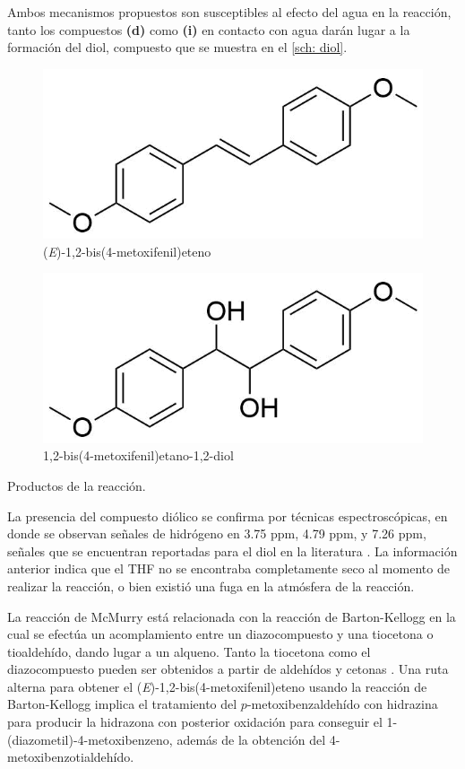 \documentclass[fleqn,11pt]{SelfArx}
\begin{document}
\pagebreak
Ambos mecanismos propuestos son susceptibles al efecto del agua en la reacci\'on, tanto los compuestos \textbf{(d)} como \textbf{(i)} en contacto con agua dar\'an lugar a la formaci\'on del diol, compuesto que se muestra en el \autoref{sch: diol}.
\begin{scheme}[h]
	\centering
	\scriptsize
	\begin{subfigure}[t]{0.49\linewidth}
		\centering
		\includegraphics[width=0.9\linewidth]{structures/product.png}
		\caption{(\textit{E})-1,2-bis(4-metoxifenil)eteno}
		\label{sch: producto}
	\end{subfigure}
	\begin{subfigure}[t]{0.49\linewidth}
		\centering
		\includegraphics[width=0.9\linewidth]{structures/product2.png}
		\caption{1,2-bis(4-metoxifenil)etano-1,2-diol}
		\label{sch: diol}
	\end{subfigure}
	\caption{Productos de la reacci\'on.}
\end{scheme}

La presencia del compuesto di\'olico se confirma por t\'ecnicas espectrosc\'opicas, en donde se observan señales de hidr\'ogeno en 3.75 ppm, 4.79 ppm, y 7.26 ppm, señales que se encuentran reportadas para el diol en la literatura \cite{Uchiyama2004}. La informaci\'on anterior indica que el THF no se encontraba completamente seco al momento de realizar la reacci\'on, o bien existi\'o una fuga en la atm\'osfera de la reacci\'on.

La reacci\'on de McMurry est\'a relacionada con la reacci\'on de Barton-Kellogg en la cual se efect\'ua un acomplamiento entre un diazocompuesto y una tiocetona o tioaldeh\'ido, dando lugar a un alqueno. Tanto la tiocetona como el diazocompuesto pueden ser obtenidos a partir de aldeh\'idos y cetonas \cite{Barton1970, Kellogg1970, Wang2010}. Una ruta alterna para obtener el (\textit{E})-1,2-bis(4-metoxifenil)eteno usando la reacci\'on de Barton-Kellogg implica el tratamiento del $p$-metoxibenzaldeh\'ido con hidrazina para producir la hidrazona con posterior oxidaci\'on para conseguir el 1-(diazometil)-4-metoxibenzeno, adem\'as de la obtenci\'on del 4-metoxibenzotialdeh\'ido.
\end{document}

